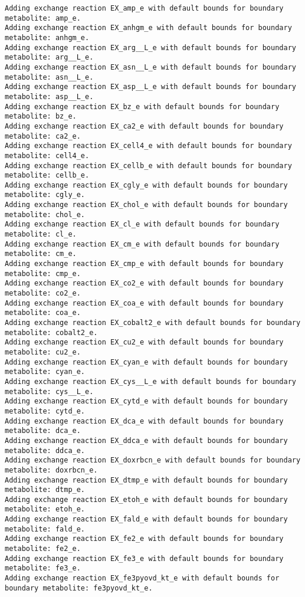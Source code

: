 \documentclass[
  letterpaper,
  DIV=11,
  numbers=noendperiod]{scrartcl}
\begin{document}
\begin{verbatim}
Adding exchange reaction EX_amp_e with default bounds for boundary metabolite: amp_e.
Adding exchange reaction EX_anhgm_e with default bounds for boundary metabolite: anhgm_e.
Adding exchange reaction EX_arg__L_e with default bounds for boundary metabolite: arg__L_e.
Adding exchange reaction EX_asn__L_e with default bounds for boundary metabolite: asn__L_e.
Adding exchange reaction EX_asp__L_e with default bounds for boundary metabolite: asp__L_e.
Adding exchange reaction EX_bz_e with default bounds for boundary metabolite: bz_e.
Adding exchange reaction EX_ca2_e with default bounds for boundary metabolite: ca2_e.
Adding exchange reaction EX_cell4_e with default bounds for boundary metabolite: cell4_e.
Adding exchange reaction EX_cellb_e with default bounds for boundary metabolite: cellb_e.
Adding exchange reaction EX_cgly_e with default bounds for boundary metabolite: cgly_e.
Adding exchange reaction EX_chol_e with default bounds for boundary metabolite: chol_e.
Adding exchange reaction EX_cl_e with default bounds for boundary metabolite: cl_e.
Adding exchange reaction EX_cm_e with default bounds for boundary metabolite: cm_e.
Adding exchange reaction EX_cmp_e with default bounds for boundary metabolite: cmp_e.
Adding exchange reaction EX_co2_e with default bounds for boundary metabolite: co2_e.
Adding exchange reaction EX_coa_e with default bounds for boundary metabolite: coa_e.
Adding exchange reaction EX_cobalt2_e with default bounds for boundary metabolite: cobalt2_e.
Adding exchange reaction EX_cu2_e with default bounds for boundary metabolite: cu2_e.
Adding exchange reaction EX_cyan_e with default bounds for boundary metabolite: cyan_e.
Adding exchange reaction EX_cys__L_e with default bounds for boundary metabolite: cys__L_e.
Adding exchange reaction EX_cytd_e with default bounds for boundary metabolite: cytd_e.
Adding exchange reaction EX_dca_e with default bounds for boundary metabolite: dca_e.
Adding exchange reaction EX_ddca_e with default bounds for boundary metabolite: ddca_e.
Adding exchange reaction EX_doxrbcn_e with default bounds for boundary metabolite: doxrbcn_e.
Adding exchange reaction EX_dtmp_e with default bounds for boundary metabolite: dtmp_e.
Adding exchange reaction EX_etoh_e with default bounds for boundary metabolite: etoh_e.
Adding exchange reaction EX_fald_e with default bounds for boundary metabolite: fald_e.
Adding exchange reaction EX_fe2_e with default bounds for boundary metabolite: fe2_e.
Adding exchange reaction EX_fe3_e with default bounds for boundary metabolite: fe3_e.
Adding exchange reaction EX_fe3pyovd_kt_e with default bounds for boundary metabolite: fe3pyovd_kt_e.

\end{verbatim}
\end{document}
